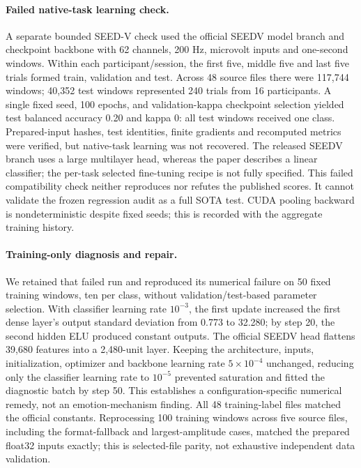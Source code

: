 \paragraph{Failed native-task learning check.}
A separate bounded SEED-V check used the official SEEDV model branch and
checkpoint backbone with 62 channels, 200 Hz, microvolt inputs and one-second
windows. Within each participant/session, the first five, middle five and last
five trials formed train, validation and test. Across 48 source files there
were 117,744 windows; 40,352 test windows represented 240 trials from 16
participants. A single fixed seed, 100 epochs, and validation-kappa checkpoint
selection yielded test balanced accuracy 0.20 and kappa 0: all test windows
received one class. Prepared-input hashes, test identities, finite gradients
and recomputed metrics were verified, but native-task learning was not
recovered. The released SEEDV branch uses a large multilayer head, whereas the
paper describes a linear classifier; the per-task selected fine-tuning recipe
is not fully specified. This failed compatibility check neither reproduces nor
refutes the published scores. It cannot validate the frozen regression audit
as a full SOTA test. CUDA pooling backward is nondeterministic despite fixed
seeds; this is recorded with the aggregate training history.

\paragraph{Training-only diagnosis and repair.}
We retained that failed run and reproduced its numerical failure on 50 fixed
training windows, ten per class, without validation/test-based parameter
selection. With classifier learning rate $10^{-3}$, the first update increased
the first dense layer's output standard deviation from 0.773 to 32.280;
by step 20, the second hidden ELU produced constant outputs. The official SEEDV
head flattens 39,680 features into a 2,480-unit layer. Keeping the architecture,
inputs, initialization, optimizer and backbone learning rate $5\times10^{-4}$
unchanged, reducing only the classifier learning rate to $10^{-5}$ prevented
saturation and fitted the diagnostic batch by step 50. This establishes a
configuration-specific numerical remedy, not an emotion-mechanism finding.
All 48 training-label files matched the official constants. Reprocessing 100
training windows across five source files, including the format-fallback and
largest-amplitude cases, matched the prepared float32 inputs exactly; this is
selected-file parity, not exhaustive independent data validation.

